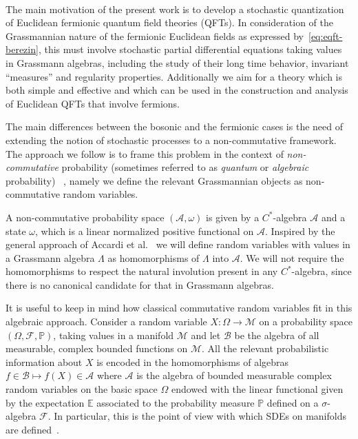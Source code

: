 \documentclass{article}
\newcommand{\tmtextit}[1]{{\itshape{#1}}}
\begin{document}
\

The main motivation of the present work is to develop a stochastic
quantization of Euclidean fermionic quantum field theories (QFTs). In
consideration of the Grassmannian nature of the fermionic Euclidean fields as
expressed by~{\eqref{eq:eqft-berezin}}, this must involve stochastic partial
differential equations taking values in Grassmann algebras, including the
study of their long time behavior, invariant ``measures'' and regularity
properties. Additionally we aim for a theory which is both simple and
effective and which can be used in the construction and analysis of Euclidean
QFTs that involve fermions.

The main differences between the bosonic and the fermionic cases is the need
of extending the notion of stochastic processes to a non-commutative
framework. The approach we follow is to frame this problem in the context of
\tmtextit{non-commutative} probability (sometimes referred to as
\tmtextit{quantum} or \tmtextit{algebraic} probability)~
{\cite{parthasarathy_introduction_1992,biane_calcul_1995,Meyerbook,streater_classical_2000,accardi_outline_2015}},
namely we define the relevant Grassmannian objects as non-commutative random
variables.

A non-commutative probability space $(\mathcal{A}, \omega)$ is given by a
$C^{\ast}$-algebra $\mathcal{A}$ and a state $\omega$, which is a linear
normalized positive functional on $\mathcal{A}$. Inspired by the general
approach of Accardi et al.~{\cite{accardi_quantum_1982}} we will define random
variables with values in a Grassmann algebra $\Lambda$ as homomorphisms of
$\Lambda$ into $\mathcal{A}$. We will not require the homomorphisms to respect
the natural involution present in any $C^{\ast}$-algebra, since there is no
canonical candidate for that in Grassmann algebras.

It is useful to keep in mind how classical commutative random variables fit
in this algebraic approach. Consider a random variable $X : \Omega \rightarrow
\mathcal{M}$ on a probability space $(\Omega, \mathcal{F}, \mathbb{P})$,
taking values in a manifold $\mathcal{M}$ and let $\mathcal{B}$ be the algebra
of all measurable, complex bounded functions on $\mathcal{M}$. All the
relevant probabilistic information about $X$ is encoded in the homomorphisms
of algebras $f \in \mathcal{B} \mapsto f (X) \in \mathcal{A}$ where
$\mathcal{A}$ is the algebra of bounded measurable complex random variables on
the basic space $\Omega$ endowed with the linear functional given by the
expectation $\mathbb{E}$ associated to the probability measure $\mathbb{P}$
defined on a $\sigma$-algebra $\mathcal{F}$. In particular, this is the point
of view with which SDEs on manifolds are defined~{\cite{hsu_stochastic_2002}}.
\end{document}
